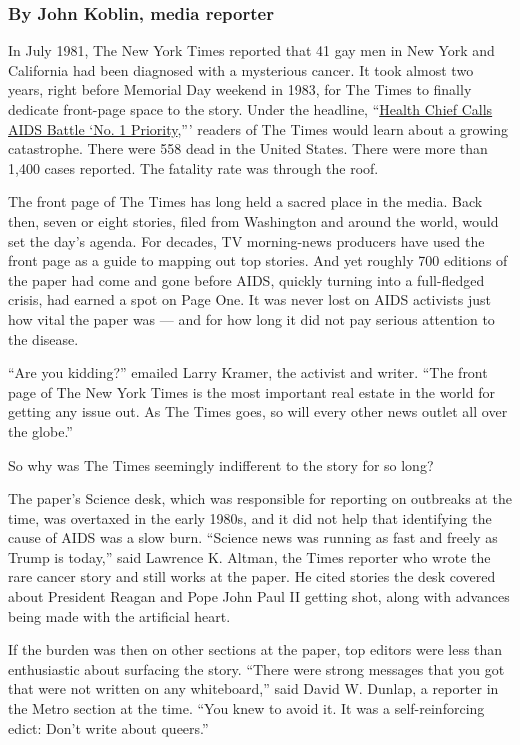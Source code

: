 \hypertarget{by-john-koblin-media-reporter}{%
\subsubsection{By John Koblin, media
reporter}\label{by-john-koblin-media-reporter}}

In July 1981, The New York Times reported that 41 gay men in New York
and California had been diagnosed with a mysterious cancer. It took
almost two years, right before Memorial Day weekend in 1983, for The
Times to finally dedicate front-page space to the story. Under the
headline,
``\href{https://www.nytimes3xbfgragh.onion/1983/05/25/us/health-chief-calls-aids-battle-no-1-priority.html}{Health
Chief Calls AIDS Battle `No. 1 Priority},''' readers of The Times would
learn about a growing catastrophe. There were 558 dead in the United
States. There were more than 1,400 cases reported. The fatality rate was
through the roof.

The front page of The Times has long held a sacred place in the media.
Back then, seven or eight stories, filed from Washington and around the
world, would set the day's agenda. For decades, TV morning-news
producers have used the front page as a guide to mapping out top
stories. And yet roughly 700 editions of the paper had come and gone
before AIDS, quickly turning into a full-fledged crisis, had earned a
spot on Page One. It was never lost on AIDS activists just how vital the
paper was --- and for how long it did not pay serious attention to the
disease.

``Are you kidding?'' emailed Larry Kramer, the activist and writer.
``The front page of The New York Times is the most important real estate
in the world for getting any issue out. As The Times goes, so will every
other news outlet all over the globe.''

So why was The Times seemingly indifferent to the story for so long?

The paper's Science desk, which was responsible for reporting on
outbreaks at the time, was overtaxed in the early 1980s, and it did not
help that identifying the cause of AIDS was a slow burn. ``Science news
was running as fast and freely as Trump is today,'' said Lawrence K.
Altman, the Times reporter who wrote the rare cancer story and still
works at the paper. He cited stories the desk covered about President
Reagan and Pope John Paul II getting shot, along with advances being
made with the artificial heart.

If the burden was then on other sections at the paper, top editors were
less than enthusiastic about surfacing the story. ``There were strong
messages that you got that were not written on any whiteboard,'' said
David W. Dunlap, a reporter in the Metro section at the time. ``You knew
to avoid it. It was a self-reinforcing edict: Don't write about
queers.''


